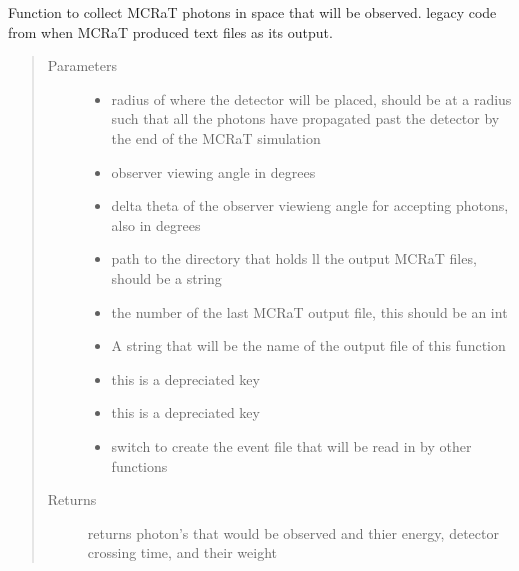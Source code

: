 \documentclass[letterpaper,10pt,english]{sphinxmanual}
\begin{document}
\begin{fulllineitems}
\label{\detokenize{mclib:mclib.event4}}
Function to collect MCRaT photons in space that will be observed. legacy code from when MCRaT produced text files
as its output.
\begin{quote}\begin{description}
\item[{Parameters}] \leavevmode\begin{itemize}
\item {} 
 \textendash{} radius of where the detector will be placed, should be at a radius such that all the photons have
propagated past the detector by the end of the MCRaT simulation

\item {} 
 \textendash{} observer viewing angle in degrees

\item {} 
 \textendash{} delta theta of the observer viewieng angle for accepting photons, also in degrees

\item {} 
 \textendash{} path to the directory that holds ll the output MCRaT files, should be a string

\item {} 
 \textendash{} the number of the last MCRaT output file, this should be an int

\item {} 
 \textendash{} A string that will be the name of the output file of this function

\item {} 
 \textendash{} this is a depreciated key

\item {} 
 \textendash{} this is a depreciated key

\item {} 
 \textendash{} switch to create the event file that will be read in by other functions

\end{itemize}

\item[{Returns}] \leavevmode
returns photon’s that would be observed and thier energy, detector crossing time, and their weight

\end{description}\end{quote}

\end{fulllineitems}
\end{document}

